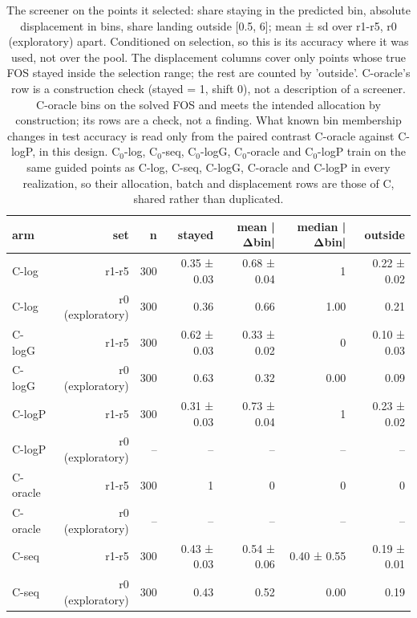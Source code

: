\begin{table}[htbp]
\centering
\small
\setlength{\tabcolsep}{4pt}
\caption{The screener on the points it selected: share staying in the predicted bin, absolute displacement in bins, share landing outside [0.5, 6]; mean ± sd over r1-r5, r0 (exploratory) apart. Conditioned on selection, so this is its accuracy where it was used, not over the pool. The displacement columns cover only points whose true FOS stayed inside the selection range; the rest are counted by 'outside'. C-oracle's row is a construction check (stayed = 1, shift 0), not a description of a screener. C-oracle bins on the solved FOS and meets the intended allocation by construction; its rows are a check, not a finding. What known bin membership changes in test accuracy is read only from the paired contrast C-oracle against C-logP, in this design. C$_0$-log, C$_0$-seq, C$_0$-logG, C$_0$-oracle and C$_0$-logP train on the same guided points as C-log, C-seq, C-logG, C-oracle and C-logP in every realization, so their allocation, batch and displacement rows are those of C, shared rather than duplicated.}
\label{tab:structural:displacement}
\begin{tabular}{lrrrrrr}
\toprule
arm & set & n & stayed & mean |Δbin| & median |Δbin| & outside \\
\midrule
C-log & r1-r5 & 300 & 0.35 ± 0.03 & 0.68 ± 0.04 & 1 & 0.22 ± 0.02 \\
C-log & r0 (exploratory) & 300 & 0.36 & 0.66 & 1.00 & 0.21 \\
C-logG & r1-r5 & 300 & 0.62 ± 0.03 & 0.33 ± 0.02 & 0 & 0.10 ± 0.03 \\
C-logG & r0 (exploratory) & 300 & 0.63 & 0.32 & 0.00 & 0.09 \\
C-logP & r1-r5 & 300 & 0.31 ± 0.03 & 0.73 ± 0.04 & 1 & 0.23 ± 0.02 \\
C-logP & r0 (exploratory) & -- & -- & -- & -- & -- \\
C-oracle & r1-r5 & 300 & 1 & 0 & 0 & 0 \\
C-oracle & r0 (exploratory) & -- & -- & -- & -- & -- \\
C-seq & r1-r5 & 300 & 0.43 ± 0.03 & 0.54 ± 0.06 & 0.40 ± 0.55 & 0.19 ± 0.01 \\
C-seq & r0 (exploratory) & 300 & 0.43 & 0.52 & 0.00 & 0.19 \\
\bottomrule
\end{tabular}
\end{table}
